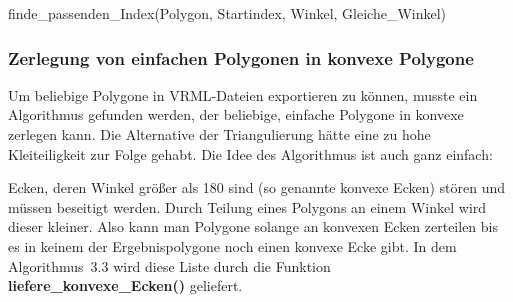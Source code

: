 \begin{function}[!ht]
	\caption{finde\_passenden\_Index(Polygon, Startindex, Winkel, Gleiche\_Winkel)}
	
	\BlankLine
\end{function}

\clearpage

\subsubsection{Zerlegung von einfachen Polygonen in konvexe Polygone}\label{Zerlegung}

Um beliebige Polygone in VRML-Dateien exportieren zu können, musste ein Algorithmus gefunden werden, der beliebige, einfache Polygone in konvexe zerlegen kann. Die Alternative der Triangulierung hätte eine zu hohe Kleiteiligkeit zur Folge gehabt. Die Idee des Algorithmus ist auch ganz einfach:

Ecken, deren Winkel größer als 180\degree\/ sind (so genannte konvexe Ecken) stören und müssen beseitigt werden. Durch Teilung eines Polygons an einem Winkel wird dieser kleiner. Also kann man Polygone solange an konvexen Ecken zerteilen bis es in keinem der Ergebnispolygone noch einen konvexe Ecke gibt. In dem Algorithmus~3.3 wird diese Liste durch die Funktion \textbf{liefere\_konvexe\_Ecken()} geliefert.

